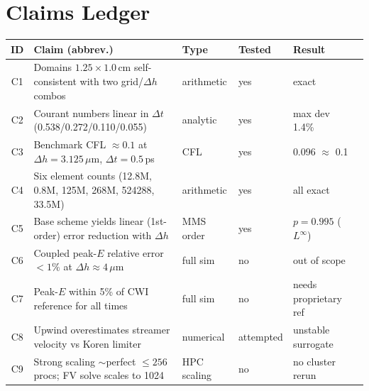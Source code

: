 \documentclass[11pt]{article}
\begin{document}
\section{Claims Ledger}
\begin{center}\small
\begin{tabular}{clllll}
\toprule
ID & Claim (abbrev.) & Type & Tested & Result \\
\midrule
C1 & Domains $1.25 \times 1.0\,\mathrm{cm}$ self-consistent with two grid/$\Delta h$ combos & arithmetic & yes & exact \\
C2 & Courant numbers linear in $\Delta t$ (0.538/0.272/0.110/0.055) & analytic & yes & max dev 1.4\% \\
C3 & Benchmark CFL $\approx 0.1$ at $\Delta h=3.125\,\mu$m, $\Delta t=0.5$\,ps & CFL & yes & 0.096 $\approx$ 0.1 \\
C4 & Six element counts (12.8M, 0.8M, 125M, 268M, 524288, 33.5M) & arithmetic & yes & all exact \\
C5 & Base scheme yields linear (1st-order) error reduction with $\Delta h$ & MMS order & yes & $p=0.995$ ($L^{\infty}$) \\
C6 & Coupled peak-$E$ relative error $<1\%$ at $\Delta h \approx 4\,\mu$m & full sim & no & out of scope \\
C7 & Peak-$E$ within 5\% of CWI reference for all times & full sim & no & needs proprietary ref \\
C8 & Upwind overestimates streamer velocity vs Koren limiter & numerical & attempted & unstable surrogate \\
C9 & Strong scaling $\sim$perfect $\le 256$ procs; FV solve scales to 1024 & HPC scaling & no & no cluster rerun \\
\bottomrule
\end{tabular}
\end{center}
\end{document}
